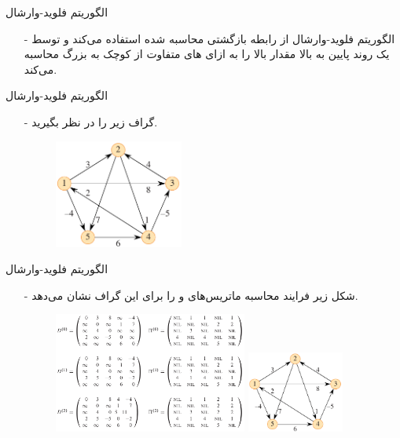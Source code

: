 \begin{frame}{‌الگوریتم فلوید-وارشال}
\begin{itemize}\itemr
\item[-]
الگوریتم فلوید-وارشال از رابطه بازگشتی محاسبه شده استفاده می‌کند و توسط یک روند پایین به بالا مقدار بالا
را به ازای
های متفاوت از کوچک به بزرگ محاسبه می‌کند.
\end{itemize}
\end{frame}


\begin{frame}{‌الگوریتم فلوید-وارشال}
\begin{itemize}\itemr
\item[-]
گراف زیر را در نظر بگیرید.
\begin{figure}
\includegraphics[width=0.4\textwidth]{figs/chap07/652-graph}
\end{figure}
\end{itemize}
\end{frame}

\begin{frame}{‌الگوریتم فلوید-وارشال}
\begin{itemize}\itemr
\item[-]
شکل زیر فرایند محاسبه ماتریس‌های
و
را برای این گراف نشان می‌دهد.
\begin{figure}
\includegraphics[width=0.6\textwidth]{figs/chap07/658-floyd-pi-1}
\includegraphics[width=0.3\textwidth]{figs/chap07/652-graph}
\end{figure}
\end{itemize}
\end{frame}


